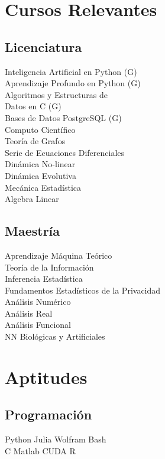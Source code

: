 \documentclass[]{tex/deedy-resume-openfont}
\begin{document}
\begin{minipage}[t]{0.33\textwidth}
\section{Cursos Relevantes}
\subsection{Licenciatura}
Inteligencia Artificial en Python (G)\\
Aprendizaje Profundo en Python (G)\\
Algoritmos y Estructuras de \\
Datos en C (G)\\
Bases de Datos PostgreSQL (G)\\
Computo Científico\\
Teoría de Grafos\\
Serie de Ecuaciones Diferenciales\\
Dinámica No-linear\\
Dinámica Evolutiva\\
Mecánica Estadística\\
Algebra Linear
\sectionsep

\subsection{Maestría}
Aprendizaje Máquina Teórico\\
Teoría de la Información\\
Inferencia Estadística\\
Fundamentos Estadísticos de la Privacidad\\
Análisis Numérico\\
Análisis Real\\
Análisis Funcional\\
NN Biológicas y Artificiales\\



\section{Aptitudes}
\subsection{Programación}
Python \textbullet{} Julia \textbullet{} Wolfram \textbullet{} Bash \\ 
C \textbullet{} Matlab  \textbullet{} CUDA \textbullet{} R 
\sectionsep


\end{minipage}
\end{document}
